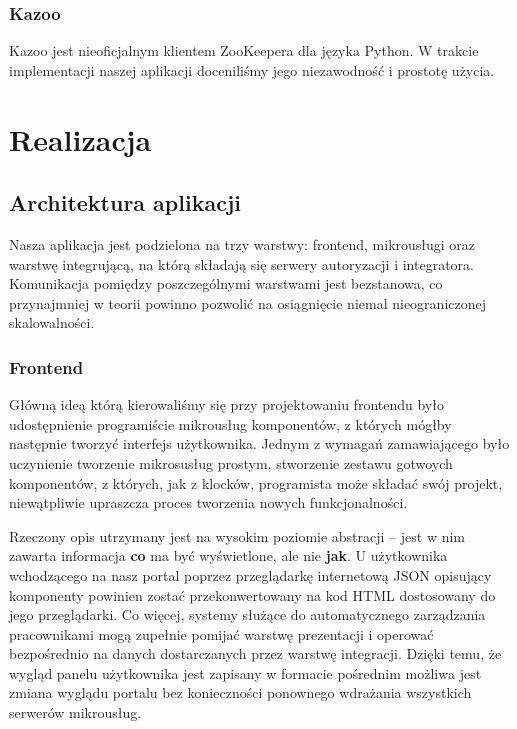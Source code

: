 \documentclass[licencjacka]{pracamgr}
\begin{document}
\subsection{Kazoo}

Kazoo jest nieoficjalnym klientem ZooKeepera dla języka Python. W trakcie
implementacji naszej aplikacji doceniliśmy jego niezawodność i prostotę użycia.

\chapter{Realizacja}

\section{Architektura aplikacji}

Nasza aplikacja jest podzielona na trzy warstwy: frontend, mikrousługi oraz
warstwę integrującą, na którą składają się serwery autoryzacji i integratora.
Komunikacja pomiędzy poszczególnymi warstwami jest bezstanowa, co przynajmniej
w teorii powinno pozwolić na osiągnięcie niemal nieograniczonej skalowalności.

\subsection{Frontend}

Główną ideą którą kierowaliśmy się przy projektowaniu frontendu było udostępnienie
programiście mikrousług komponentów, z których mógłby następnie tworzyć interfejs
użytkownika. Jednym z wymagań zamawiającego było uczynienie tworzenie mikrosusług prostym,
stworzenie zestawu gotwoych komponentów, z których, jak z klocków, programista może
składać swój projekt, niewątpliwie upraszcza proces tworzenia nowych funkcjonalności.

Rzeczony opis utrzymany jest na wysokim poziomie abstracji --
jest w nim zawarta informacja \textbf{co} ma być wyświetlone, ale nie \textbf{jak}.
U użytkownika wchodzącego na nasz portal poprzez przeglądarkę
internetową JSON opisujący komponenty powinien zostać przekonwertowany na kod HTML
dostosowany do jego przeglądarki. Co więcej, systemy służące do automatycznego
zarządzania pracownikami mogą zupełnie pomijać warstwę prezentacji i operować
bezpośrednio na danych dostarczanych przez warstwę integracji. Dzięki temu,
że wygląd panelu użytkownika jest zapisany w formacie pośrednim możliwa jest
zmiana wyglądu portalu bez konieczności ponownego wdrażania wszystkich serwerów
mikrousług.
\end{document}
